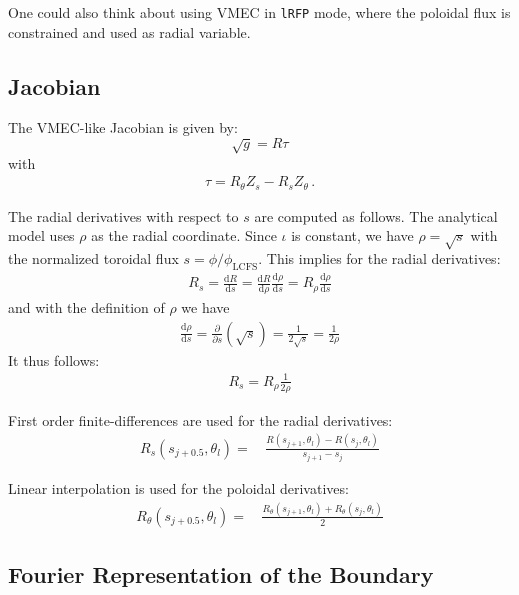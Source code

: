 One could also think about using VMEC in \texttt{lRFP} mode,
where the poloidal flux is constrained and used as radial variable.

\subsection{Jacobian}

The VMEC-like Jacobian is given by:
\begin{equation}
 \sqrt{g} = R \tau
\end{equation}
with
\begin{align}
 \tau = R_\theta Z_s - R_s Z_\theta \, .
\end{align}

The radial derivatives with respect to $s$ are computed as follows.
The analytical model uses $\rho$ as the radial coordinate.
Since $\iota$ is constant, we have $\rho = \sqrt{s}$
with the normalized toroidal flux $s = \phi / \phi_\textrm{LCFS}$.
This implies for the radial derivatives:
\begin{align}
 R_s = \frac{\mathrm{d}R}{\mathrm{d}s}
 = \frac{\mathrm{d}R}{\mathrm{d}\rho} \frac{\mathrm{d}\rho}{\mathrm{d}s}
 = R_\rho \frac{\mathrm{d}\rho}{\mathrm{d}s}
\end{align}
and with the definition of $\rho$ we have
\begin{align}
 \frac{\mathrm{d}\rho}{\mathrm{d}s}
 = \frac{\partial}{\partial s} \left( \sqrt{s} \right)
 = \frac{1}{2 \sqrt{s}} = \frac{1}{2 \rho}
\end{align}
It thus follows:
\begin{align}
 R_s = R_\rho \frac{1}{2 \rho}
\end{align}

First order finite-differences are used for the radial derivatives:
\begin{align}
 R_s(s_{j+0.5}, \theta_l) =&\,
   \frac{R(s_{j+1}, \theta_l) - R(s_{j}, \theta_l)}{s_{j+1} - s_{j}}
\end{align}

Linear interpolation is used for the poloidal derivatives:
\begin{align}
 R_\theta(s_{j+0.5}, \theta_l) =&\,
   \frac{R_\theta(s_{j+1}, \theta_l) + R_\theta(s_{j}, \theta_l)}{2}
\end{align}


\subsection{Fourier Representation of the Boundary}

